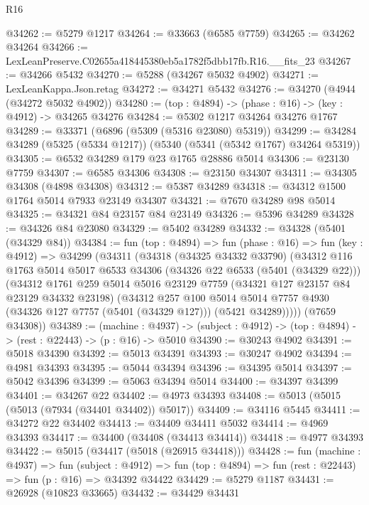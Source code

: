 \begin{lexlean}{R16}
\begin{coremodule}
@34262 := @5279 @1217
@34264 := @33663 (@6585 @7759)
@34265 := @34262 @34264
@34266 := LexLeanPreserve.C02655a418445380eb5a1782f5dbb17fb.R16.__fits_23
@34267 := @34266 @5432
@34270 := @5288 (@34267 @5032 @4902)
@34271 := LexLeanKappa.Json.retag
@34272 := @34271 @5432
@34276 := @34270 (@4944 (@34272 @5032 @4902))
@34280 := (top : @4894) -> (phase : @16) -> (key : @4912) -> @34265 @34276
@34284 := @5302 @1217 @34264 @34276 @1767
@34289 := @33371 (@6896 (@5309 (@5316 @23080) @5319))
@34299 := @34284 @34289 (@5325 (@5334 @1217)) (@5340 (@5341 (@5342 @1767) @34264 @5319))
@34305 := @6532 @34289 @179 @23 @1765 @28886 @5014
@34306 := @23130 @7759
@34307 := @6585 @34306
@34308 := @23150 @34307
@34311 := @34305 @34308 (@4898 @34308)
@34312 := @5387 @34289
@34318 := @34312 @1500 @1764 @5014 @7933 @23149 @34307
@34321 := @7670 @34289 @98 @5014
@34325 := @34321 @84 @23157 @84 @23149
@34326 := @5396 @34289
@34328 := @34326 @84 @23080
@34329 := @5402 @34289
@34332 := @34328 (@5401 (@34329 @84))
@34384 := fun (top : @4894) =>
  fun (phase : @16) =>
  fun (key : @4912) =>
  @34299
    (@34311
      (@34318
        (@34325 @34332 @33790)
        (@34312
          @116
          @1763
          @5014
          @5017
          @6533
          @34306
          (@34326 @22 @6533 (@5401 (@34329 @22)))
          (@34312
            @1761
            @259
            @5014
            @5016
            @23129
            @7759
            (@34321 @127 @23157 @84 @23129 @34332 @23198)
            (@34312
              @257
              @100
              @5014
              @5014
              @7757
              @4930
              (@34326 @127 @7757 (@5401 (@34329 @127)))
              (@5421 @34289)))))
      (@7659 @34308))
@34389 := (machine : @4937) ->
  (subject : @4912) -> (top : @4894) -> (rest : @22443) -> (p : @16) -> @5010
@34390 := @30243 @4902
@34391 := @5018 @34390
@34392 := @5013 @34391
@34393 := @30247 @4902
@34394 := @4981 @34393
@34395 := @5044 @34394
@34396 := @34395 @5014
@34397 := @5042 @34396
@34399 := @5063 @34394 @5014
@34400 := @34397 @34399
@34401 := @34267 @22
@34402 := @4973 @34393
@34408 := @5013 (@5015 (@5013 (@7934 (@34401 @34402)) @5017))
@34409 := @34116 @5445
@34411 := @34272 @22 @34402
@34413 := @34409 @34411 @5032
@34414 := @4969 @34393
@34417 := @34400 (@34408 (@34413 @34414))
@34418 := @4977 @34393
@34422 := @5015 (@34417 (@5018 (@26915 @34418)))
@34428 := fun (machine : @4937) =>
  fun (subject : @4912) =>
  fun (top : @4894) => fun (rest : @22443) => fun (p : @16) => @34392 @34422
@34429 := @5279 @1187
@34431 := @26928 (@10823 @33665)
@34432 := @34429 @34431

\end{coremodule}
\end{lexlean}
